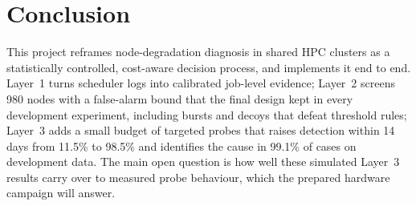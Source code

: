 \documentclass[10pt,a4paper]{article}
\begin{document}
\section{Conclusion}
This project reframes node-degradation diagnosis in shared HPC clusters as a statistically controlled, cost-aware decision process, and implements it end to end. Layer~1 turns scheduler logs into calibrated job-level evidence; Layer~2 screens 980 nodes with a false-alarm bound that the final design kept in every development experiment, including bursts and decoys that defeat threshold rules; Layer~3 adds a small budget of targeted probes that raises detection within 14 days from 11.5\% to 98.5\% and identifies the cause in 99.1\% of cases on development data. The main open question is how well these simulated Layer~3 results carry over to measured probe behaviour, which the prepared hardware campaign will answer.
\end{document}
